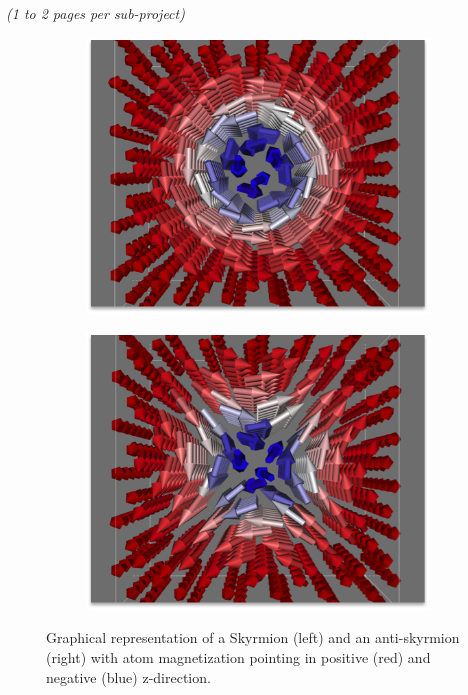 \documentclass [a4paper, 12pt]{article}
\begin{document}

\textit{(1 to 2 pages per sub-project)}

\begin{figure}
	\centering
	\begin{subfigure}{.5\textwidth}
		  \centering
		  \includegraphics[width=.99\linewidth]{Figures/MnGe_skyrmion.png}
		  \label{fig:sub1}
	\end{subfigure}%
	\begin{subfigure}{.5\textwidth}
		  \centering
		  \includegraphics[width=.99\linewidth]{Figures/MnGe_antiskyrmion.png}
                  \label{fig:sub2}
	\end{subfigure}
	\caption{Graphical representation of a Skyrmion (left) and an anti-skyrmion (right) 
	with atom magnetization pointing in positive (red) and negative (blue) z-direction.}
	\label{fig:test}
\end{figure}
\end{document}
